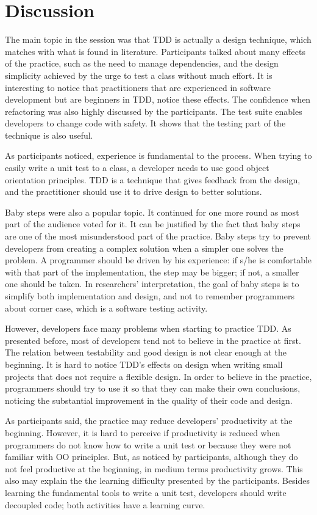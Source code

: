 \section{Discussion}

The main topic in the session was that TDD is actually a design technique,
which matches with what is found in literature. Participants talked about many
effects of the practice, such as the need to manage dependencies, and the design
simplicity achieved by the urge to test a class without much effort. It is
interesting to notice that practitioners that are experienced in software
development but are beginners in TDD, notice these effects. 
The confidence when refactoring was also highly discussed by the participants.
The test suite enables developers to change code with safety. It shows that the
testing part of the technique is also useful.

As participants noticed, experience is fundamental to the process. When
trying to easily write a unit test to a class, a developer needs to use good
object orientation principles. TDD is a technique that gives feedback from the
design, and the practitioner should use it to drive design to better solutions.

Baby steps were also a popular topic. It continued for one more
round as most part of the audience voted for it.
It can be justified by the fact that baby steps are one of the most
misunderstood part of the practice. Baby steps try to prevent developers from
creating a complex solution when a simpler one solves the problem. A programmer
should be driven by his experience: if s/he is comfortable with that part of the
implementation, the step may be bigger; if not, a smaller one should be taken.
In researchers' interpretation, the goal of baby steps is to simplify both
implementation and design, and not to remember programmers about corner case,
which is a software testing activity.

However, developers face many problems when starting to practice TDD. As
presented before, most of developers tend not to believe in the practice at
first. The relation between testability and good design is not clear enough at the
beginning.
It is hard to notice TDD's effects on design when writing small projects that
does not require a flexible design. In order to believe in the practice,
programmers should try to use it so that they can make their own conclusions, 
noticing the substantial improvement in the quality of their code and design.

As participants said, the practice may reduce developers' productivity at the
beginning. However, it is hard to perceive if productivity is reduced when
programmers do not know how to write a unit test or because they were not familiar with OO
principles. But, as noticed by participants, although they do not feel
productive at the beginning, in medium terms productivity grows. 
This also may explain the the learning difficulty presented by the participants.
Besides learning the fundamental tools to write a unit test, developers should
write decoupled code; both activities have a learning curve.

